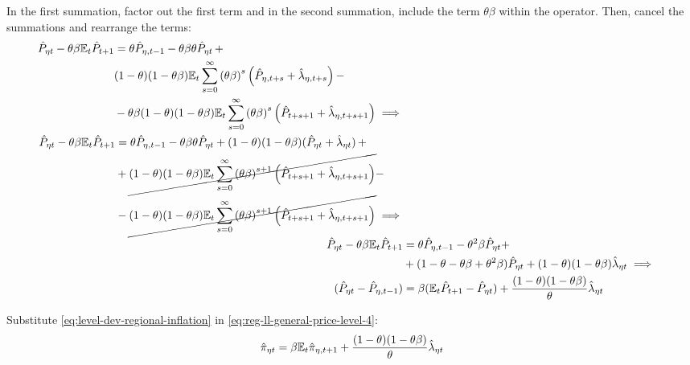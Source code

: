 \documentclass[../thesis.tex]{subfiles}
\begin{document}
In the first summation, factor out the first term and in the second summation, include the term $\theta \beta$ within the operator. Then, cancel the summations and rearrange the terms:
\begin{align}
	\begin{split}
		\hat{P}_{\eta t} - \theta \beta {\mathbb{E}_{t}} \hat{P}_{t+1} &= \theta \hat{P}_{\eta, t-1} - \theta \beta \theta \hat{P}_{\eta t} \, + \\
		& (1-\theta) (1- \theta \beta) {\mathbb{E}_{t}} \sum_{s=0}^{\infty} \left( \theta \beta \right)^s \left( \hat{P}_{\eta, t+s} + \hat{\lambda}_{\eta, t+s} \right) -
		\\
		& - \theta \beta (1-\theta) (1- \theta \beta) {\mathbb{E}_{t}} \sum_{s=0}^{\infty} \left( \theta \beta \right)^s \left( \hat{P}_{t+s+1} + \hat{\lambda}_{\eta, t+s+1} \right) \implies \nonumber 
	\end{split} \\
	\begin{split}
		\hat{P}_{\eta t} - \theta \beta {\mathbb{E}_{t}} \hat{P}_{t+1} &= \theta \hat{P}_{\eta, t-1} - \theta \beta \theta \hat{P}_{\eta t} + (1-\theta) (1- \theta \beta) (\hat{P}_{\eta t} + \hat{\lambda}_{\eta t}) \, + 
		\\
		& + \cancel{(1-\theta) (1- \theta \beta) {\mathbb{E}_{t}} \sum_{s=0}^{\infty} \left( \theta \beta \right)^{s+1} \left( \hat{P}_{t+s+1} + \hat{\lambda}_{\eta, t+s+1} \right)} -
		\\
		& - \cancel{(1-\theta) (1- \theta \beta) {\mathbb{E}_{t}} \sum_{s=0}^{\infty} \left( \theta \beta \right)^{s+1} \left( \hat{P}_{t+s+1} + \hat{\lambda}_{\eta, t+s+1} \right)} \implies \nonumber 
	\end{split} \\
	\hat{P}_{\eta t} - \theta \beta {\mathbb{E}_{t}} \hat{P}_{t+1} &= \theta \hat{P}_{\eta, t-1} - \theta^2 \beta \hat{P}_{\eta t} + \nonumber \\
	& + (1- \theta -\theta \beta + \theta^2 \beta) \hat{P}_{\eta t} + (1-\theta) (1- \theta \beta) \hat{\lambda}_{\eta t} \implies \nonumber \\
	(\hat{P}_{\eta t} - \hat{P}_{\eta, t-1}) &= \beta ({\mathbb{E}_{t}} \hat{P}_{t+1} - \hat{P}_{\eta t}) + \frac{(1-\theta) (1- \theta \beta)}{\theta} \hat{\lambda}_{\eta t}
	\label{eq:reg-ll-general-price-level-4}
\end{align}

Substitute \ref{eq:level-dev-regional-inflation} in \ref{eq:reg-ll-general-price-level-4}:
\begin{align}
	\hat{\pi}_{\eta t} = \beta {\mathbb{E}_{t}} \hat{\pi}_{\eta, t+1} + \frac{(1-\theta) (1- \theta \beta)}{\theta} \hat{\lambda}_{\eta t} \label{eq:reg-nk-phillips-curve-mc}
\end{align}
\end{document}
